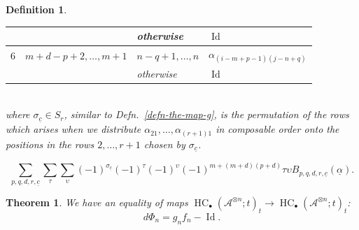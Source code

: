 \documentclass[10pt,a4paper]{amsart}
\def\A{{\mathcal{A}}}
\newtheorem{defn}{Definition}
\newtheorem{theorem}{Theorem}
\DeclareMathOperator{\hochcx}{{HC}}
\DeclareMathOperator{\id}{Id}
\begin{document}
\begin{defn}
\begin{tabular}{|l|l|l|l|}
\\
&
&
otherwise
&
$\id$  
\\
\hline
$6$
&
$m+d-p+2, \dots, m+1$
& 
$n-q+1,\dots,n$  
&
$\alpha_{(i-m+p-1)(j-n+q)}$ 
\\
&
& 
otherwise
&
$\id$ 
\\
\hline
\end{tabular}
\\
where $\sigma_{\underline{c}} \in S_r$, similar to 
Defn.~\ref{defn-the-map-g}, is the permutation of the rows
which arises when we distribute  
$\alpha_{21}, \dots, \alpha_{(r+1)1}$ in composable order
onto the positions in the rows $2,\dots,r+1$ chosen by
$\sigma_{\underline{c}}$. 
\end{defn}

\begin{equation}
\label{eqn-defn-of-psi'-n}
\sum_{p, q, d, r, \underline{c}}
\sum_{\tau }
\sum_{\upsilon}
(-1)^{\sigma_{\underline{c}}}
(-1)^{\tau}
(-1)^{\upsilon} 
(-1)^{m+(m+d)(p+d)}
\tau \upsilon B_{p,q,d,r,\underline{c}} \left( \underline{\alpha} \right). 
\end{equation}

\begin{theorem}
\label{theorem-phi-is-the-homotopy-of-gf-minus-id}
We have an equality of maps 
$\hochcx_\bullet(\A^{\otimes n}; t)_t 
\rightarrow \hochcx_\bullet(\A^{\otimes n}; t)_t$:
$$ d\Phi_n = g_n f_n - \id. $$
\end{theorem}
\end{document}
